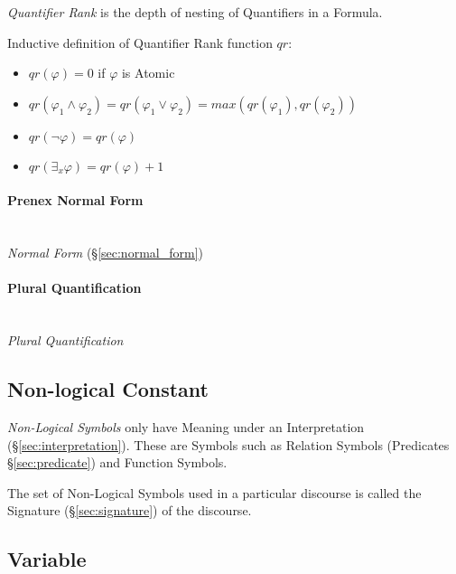 \emph{Quantifier Rank} is the depth of nesting of Quantifiers in a
Formula.

Inductive definition of Quantifier Rank function $qr$:
\begin{itemize}
\item $qr(\varphi) = 0$ if $\varphi$ is Atomic
\item $qr(\varphi_1 \wedge \varphi_2) = qr(\varphi_1 \vee \varphi_2) = max(qr(\varphi_1),qr(\varphi_2))$
\item $qr(\neg \varphi) = qr(\varphi)$
\item $qr(\exists_x \varphi) = qr(\varphi) + 1$
\end{itemize}



\paragraph{Prenex Normal Form}\label{sec:prenex_normal}\hfill \\

\emph{Normal Form} (\S\ref{sec:normal_form})



\paragraph{Plural Quantification}\label{sec:plural_quantification}\hfill \\

\emph{Plural Quantification}



\subsection{Non-logical Constant}\label{sec:nonlogical_constant}

\emph{Non-Logical Symbols} only have Meaning under an Interpretation
(\S\ref{sec:interpretation}). These are Symbols such as Relation
Symbols (Predicates \S\ref{sec:predicate}) and Function Symbols.

The set of Non-Logical Symbols used in a particular discourse is
called the Signature (\S\ref{sec:signature}) of the discourse.



\subsection{Variable}\label{sec:variable}

